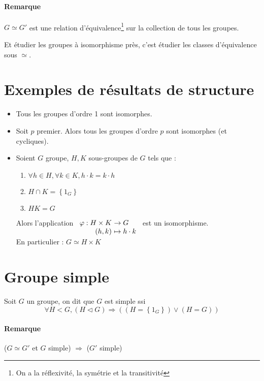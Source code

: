 \documentclass[a4paper,10pt]{report}
\newcommand{\set}[1]{\left\lbrace #1 \right\rbrace } %
\newcommand{\so}{\Rightarrow}
\newcommand{\mfootnote}[1]{\up{(}\footnote{#1}\up{)}}
\begin{document}
  \paragraph{Remarque} $G \simeq G'$ est une relation
  d'équivalence\mfootnote{On a la réflexivité, la symétrie et la
  transitivité} sur la collection de tous les groupes.

  Et étudier les groupes à isomorphisme près, c'est étudier les classes
  d'équivalence sous $\simeq$.

  \section{Exemples de résultats de structure}
   \begin{itemize}
     \item Tous les groupes d'ordre 1 sont isomorphes.
     \item Soit $p$ premier. Alors tous les groupes d'ordre $p$ sont isomorphes
       (et cycliques).
     \item 
       \begin{comment}
	 (Preuve 05/11/08 p2, verso) 
       \end{comment}
       Soient $G$ groupe, $H, K$ sous-groupes de $G$ tels que :
       \begin{enumerate}
	 \item $\forall h \in H, \forall k \in K, h \cdot k = k \cdot h$
	 \item $H \cap K = \set{1_G}$
	 \item $HK = G$ 
       \end{enumerate}
       Alors l'application $
       \begin{array}[t]{r@{\ }l}
	 \varphi : H \times K & \to G\\
	 (h,k) & \mapsto h\cdot k
       \end{array}$ est un isomorphisme.\\
       En particulier : $G \simeq H \times K$
   \end{itemize}

  \section{Groupe simple}
   Soit $G$ un groupe, on dit que $G$ est simple ssi
   $$\forall H <G,
   (H \triangleleft G) \so \left( (H=\set{1_G}) \lor (H=G) \right)$$

   \paragraph{Remarque} ($G \simeq G'$ et $G$ simple) $\so$ ($G'$ simple)
\end{document}
